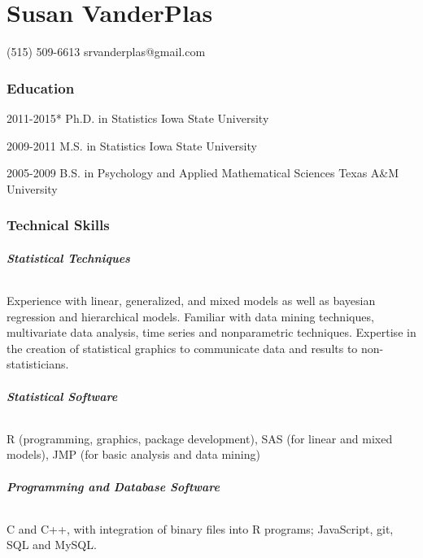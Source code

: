 \documentclass[10pt]{tccv}
\begin{document}
\part{Susan VanderPlas}


    {(515) 509-6613}
    {srvanderplas@gmail.com}

\section{Education}

\begin{yearlist}

\item{2011-2015*}
     {Ph.D. in Statistics}
     {Iowa State University}

\item{2009-2011}
     {M.S. in Statistics}
     {Iowa State University}

\item{2005-2009}
     {B.S. in Psychology and Applied Mathematical Sciences}
     {Texas A\&M University}

\end{yearlist}

\section{Technical Skills}
\paragraph{\textbf{Statistical Techniques}}
Experience with linear, generalized, and mixed models as well as bayesian regression and hierarchical models. Familiar with data mining techniques, multivariate data analysis, time series and nonparametric techniques. Expertise in the creation of statistical graphics to communicate data and results to non-statisticians.\vspace{-6pt}
\paragraph{\textbf{Statistical Software}}
R (programming, graphics, package development), SAS (for linear and mixed models), JMP (for basic analysis and data mining)\vspace{-6pt}
\paragraph{\textbf{Programming and Database Software}}
C and C++, with integration of binary files into R programs; JavaScript, git, SQL and MySQL.\vspace{-6pt}
\end{document}
